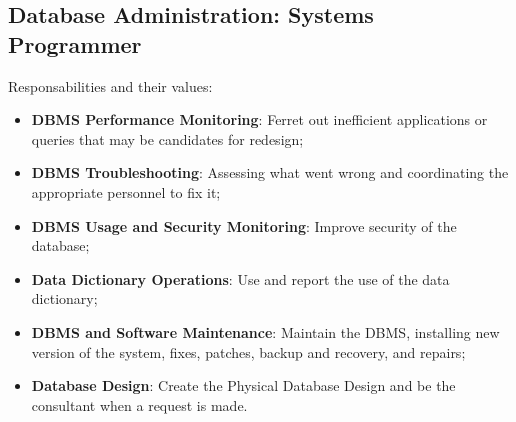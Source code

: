 		\subsection{Database Administration: Systems Programmer}
			Responsabilities and their values:
			\begin{itemize}
				\item{\textbf{DBMS Performance Monitoring}: Ferret out inefficient applications or queries that may be candidates for redesign;}
				\item{\textbf{DBMS Troubleshooting}: Assessing what went wrong and coordinating the appropriate personnel to fix it;}
				\item{\textbf{DBMS Usage and Security Monitoring}: Improve security of the database;}
				\item{\textbf{Data Dictionary Operations}: Use and report the use of the data dictionary;}
				\item{\textbf{DBMS and Software Maintenance}: Maintain the DBMS, installing new version of the system, fixes, patches, backup and recovery, and repairs;}
				\item{\textbf{Database Design}: Create the Physical Database Design and be the consultant when a request is made.}
			\end{itemize}
